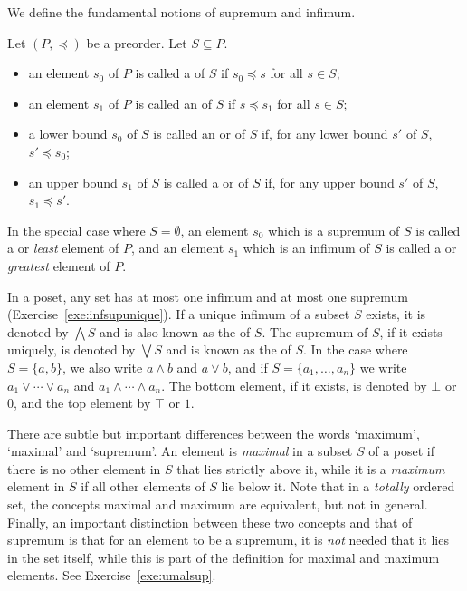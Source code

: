 We define the fundamental notions of supremum and infimum.

\begin{definition}\label{def:supinf}
Let $(P,\preceq)$ be a preorder. Let $S \subseteq P$.
\begin{itemize}
\item an element $s_0$ of $P$ is called a  of $S$ if $s_0 \preceq s$ for all $s \in S$;
\item an element $s_1$ of $P$ is called an  of $S$ if $s \preceq s_1$ for all $s \in S$;
\item a lower bound $s_0$ of $S$ is called an  or  of $S$ if, for any lower bound $s'$ of $S$, $s' \preceq s_0$;
\item an upper bound $s_1$ of $S$ is called a  or  of $S$ if, for any upper bound $s'$ of $S$, $s_1 \preceq s'$.
\end{itemize}
In the special case where $S = \emptyset$, an element $s_0$ which is a supremum of $S$ is called a  or \emph{least} element of $P$, and an element $s_1$ which is an infimum of $S$ is called a  or \emph{greatest} element of $P$.
\end{definition}
In a poset, any set has at most one infimum and at most one supremum (Exercise~\ref{exe:infsupunique}). If a unique infimum of a subset $S$ exists, it is denoted by $\bigwedge S$ and is also known as the  of $S$. The supremum of $S$, if it exists uniquely, is denoted by $\bigvee S$ and is known as the  of $S$. In the case where $S = \{a,b\}$, we also write $a \wedge b$ and $a \vee b$, and if $S = \{a_1,\dots,a_n\}$ we write $a_1 \vee \cdots \vee a_n$ and $a_1 \wedge \cdots \wedge a_n$. The bottom element, if it exists, is denoted by $\bot$ or $0$, and the top element by $\top$ or $1$.

\begin{remark}
There are subtle but important differences between the words `maximum', `maximal' and `supremum'. An element is \emph{maximal} in a subset $S$ of a poset if there is no other element in $S$ that lies strictly above it, while it is a \emph{maximum} element in $S$ if all other elements of $S$ lie below it. Note that in a \emph{totally} ordered set, the concepts maximal and maximum are equivalent, but not in general. Finally, an important distinction between these two concepts and that of supremum is that for an element to be a supremum, it is \emph{not} needed that it lies in the set itself, while this is part of the definition for maximal and maximum elements. See Exercise~\ref{exe:umalsup}.
\end{remark} %

